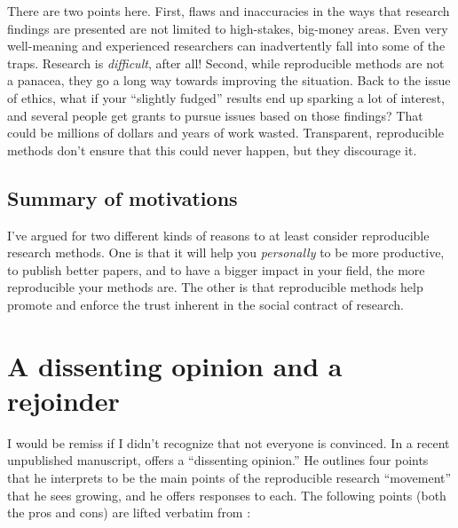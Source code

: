 \documentclass{book}
\begin{document}
There are two points here. First, flaws and inaccuracies in the ways that research findings are presented are not limited to high-stakes, big-money areas. Even very well-meaning and experienced researchers can inadvertently fall into some of the traps. Research is \emph{difficult}, after all!  Second, while reproducible methods are not a panacea, they go a long way towards improving the situation. Back to the issue of ethics, what if your ``slightly fudged'' results end up sparking a lot of interest, and several people get grants to pursue issues based on those findings? That could be millions of dollars and years of work wasted.  Transparent, reproducible methods don't ensure that this could never happen, but they discourage it.
\subsection{Summary of motivations}
\label{sec-2-3-3}

I've argued for two different kinds of reasons to at least consider reproducible research methods. One is that it will help you \emph{personally} to be more productive, to publish better papers, and to have a bigger impact in your field, the more reproducible your methods are. The other is that reproducible methods help promote and enforce the trust inherent in the social contract of research.  
\section{A dissenting opinion and a rejoinder}
\label{sec-2-4}
\label{dissenting}

I would be remiss if I didn't recognize that not everyone is convinced. In a recent unpublished manuscript, \textcite{drummond2012reproducible} offers a ``dissenting opinion.'' He outlines four points that he interprets to be the main points of the reproducible research ``movement'' that he sees growing, and he offers responses to each. The following points (both the pros and cons) are lifted verbatim from \textcite[][p.2--3]{drummond2012reproducible}:
\end{document}
